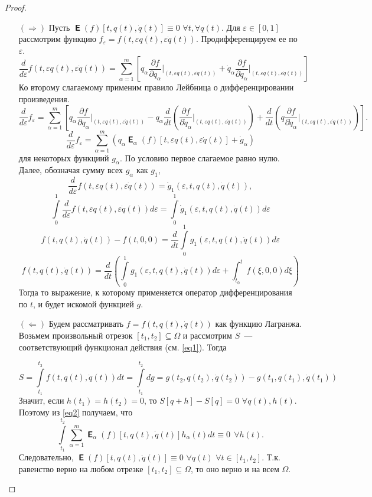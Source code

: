 \documentclass[11pt,a4paper]{article}
\theoremstyle{definition}
\numberwithin{equation}{section}
\def\e{{\varepsilon}}
\begin{document}
\begin{proof}
	$ $
	\begin{enumerate}
		\item[$(\Rightarrow)$] Пусть $\mbfsansE(f)[t,q(t),\dot{q}(t)]\equiv 0$ $\forall t,\forall q(t)$. Для $\e\in[0,1]$ рассмотрим функцию $f_\e=f(t,\e q(t), \e \dot{q}(t))$. Продифференцируем ее по $\e$.
		$$\dfrac{d}{d\e}f(t,\e q(t), \e \dot{q}(t))=\sum\limits_{\alpha=1}^m\left[  q_\alpha\dfrac{\partial f}{\partial q_\alpha}\bigg|_{(t,\e q(t), \e \dot{q}(t))}+  \dot{q}_\alpha\dfrac{\partial f}{\partial \dot{q}_\alpha}\bigg|_{(t,\e q(t), \e \dot{q}(t))}\right] $$
		Ко второму слагаемому применим правило Лейбница о дифференцировании произведения.
		$$\dfrac{d}{d\e}f_\e=\sum\limits_{\alpha=1}^m\left[  q_\alpha\dfrac{\partial f}{\partial q_\alpha}\bigg|_{(t,\e q(t), \e \dot{q}(t))}-  q_\alpha\dfrac{d}{dt}\left(\dfrac{\partial f}{\partial \dot{q}_\alpha}\bigg|_{(t,\e q(t), \e \dot{q}(t))}\right) + \dfrac{d}{dt}\left(q\dfrac{\partial f}{\partial \dot{q}_\alpha}\bigg|_{(t,\e q(t), \e \dot{q}(t))} \right) \right]. $$
		$$\dfrac{d}{d\e}f_\e=\sum\limits_{\alpha=1}^m\left(q_\alpha \mbfsansE_\alpha (f)[t,\e q(t), \e \dot{q}(t)]+\dot{g}_\alpha  \right) $$
		для некоторых функциий $g_\alpha$. По условию  первое слагаемое равно нулю. Далее, обозначая сумму всех $g_\alpha$ как $g_1$,
		$$\dfrac{d}{d\e}f(t,\e q(t), \e \dot{q}(t))=\dot{g}_1(\e, t,q(t),\dot{q}(t)),$$
		$$\int\limits_0^1 \dfrac{d}{d\e}f(t,\e q(t), \e \dot{q}(t))d\e=\int\limits_0^1 \dot{g}_1(\e, t,q(t),\dot{q}(t))d\e$$
		$$f(t,q(t),\dot{q}(t))-f(t,0,0)=\dfrac{d}{dt}\int\limits_0^1 g_1(\e, t,q(t),\dot{q}(t))d\e$$
		$$f(t,q(t),\dot{q}(t))=\dfrac{d}{dt}\left(\int\limits_0^1 g_1(\e, t,q(t),\dot{q}(t))d\e+ \int_{t_0}^t f(\xi,0,0)d\xi\right) $$
		Тогда то выражение, к которому применяется оператор дифференцирования по $t$, и будет искомой функцией $g$.
		\item[$(\Leftarrow)$] Будем рассматривать $f=f(t,q(t),\dot{q}(t))$ как функцию Лагранжа. Возьмем произвольный отрезок $[t_1,t_2]\subseteq\Omega$ и рассмотрим $S$~— соответствующий функционал действия (см. \ref{eq1}). Тогда
		
		$$S=\int\limits_{t_1}^{t_2}f(t,q(t),\dot{q}(t))dt=\int\limits_{t_1}^{t_2}dg=g(t_2,q(t_2),\dot{q}(t_2))-g(t_1,q(t_1),\dot{q}(t_1))$$
 Значит, если $h(t_1)=h(t_2)=0$, то $S[q+h]-S[q]=0$ $\forall q(t),h(t)$. Поэтому из \ref{eq2} получаем, что
 $$\int\limits_{t_1}^{t_2}\sum\limits_{\alpha=1}^m \mbfsansE_\alpha(f)[t,q(t),\dot{q}(t)]h_\alpha(t)dt\equiv0~~\forall h(t). $$
 Следовательно, $\mbfsansE(f)[t,q(t),\dot{q}(t)]\equiv0$ $\forall q(t)$ $\forall t\in[t_1,t_2]$. Т.к. равенство верно на любом отрезке $[t_1,t_2]\subseteq\Omega$, то оно верно и на всем $\Omega$.
	\end{enumerate}
\end{proof}
\end{document}
